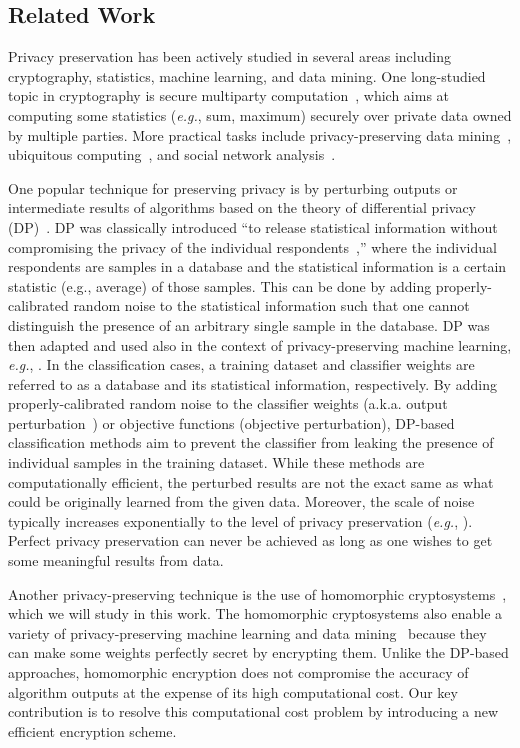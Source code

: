 \documentclass[10pt,twocolumn,letterpaper]{article}
\def\eg{{\it e.g.}}
\begin{document}
\subsection*{Related Work}
Privacy preservation has been actively studied in several areas including cryptography, statistics, machine learning, and data mining. One long-studied topic in cryptography is secure multiparty computation~\cite{Yao1986a}, which aims at computing some statistics (\eg, sum, maximum) securely over private data owned by multiple parties. More practical tasks include privacy-preserving data mining~\cite{Aggarwal2008a,Agrawal2000}, ubiquitous computing~\cite{Krumm2009a}, and social network analysis~\cite{Zhou2008a}.

One popular technique for preserving privacy is by perturbing outputs or intermediate results of algorithms based on the theory of differential privacy (DP)~\cite{Dwork2006a,Dwork2008a}. DP was classically introduced ``to release statistical information without compromising the privacy of the individual respondents~\cite{Dwork2008a},'' where the individual respondents are samples in a database and the statistical information is a certain statistic (e.g., average) of those samples. This can be done by adding properly-calibrated random noise to the statistical information such that one cannot distinguish the presence of an arbitrary single sample in the database. DP was then adapted and used also in the context of privacy-preserving machine learning, \eg, \cite{Chaudhuri2008a,Chaudhuri2011a,Chu2016a,Pathak2010a,Rajkumar2012a,Shokri2015a}. In the classification cases, a training dataset and classifier weights are referred to as a database and its statistical information, respectively. By adding properly-calibrated random noise to the classifier weights (a.k.a. output perturbation~\cite{Chaudhuri2011a}) or objective functions (objective perturbation), DP-based classification methods aim to prevent the classifier from leaking the presence of individual samples in the training dataset. While these methods are computationally efficient, the perturbed results are not the exact same as what could be originally learned from the given data. Moreover, the scale of noise typically increases exponentially to the level of privacy preservation (\eg, \cite{Dwork2006}). Perfect privacy preservation can never be achieved as long as one wishes to get some meaningful results from data. 

Another privacy-preserving technique is the use of homomorphic cryptosystems~\cite{OdedGoldreich2004}, which we will study in this work. The homomorphic cryptosystems also enable a variety of privacy-preserving machine learning and data mining~\cite{Bost2015a,Dowlin2016a,Graepel2012,Lindell2009a,Pathak2010a,Pinkas2002a,Takabi2016a,Vaidya2003a,Yuan2014a} because they can make some weights perfectly secret by encrypting them. Unlike the DP-based approaches, homomorphic encryption does not compromise the accuracy of algorithm outputs at the expense of its high computational cost. Our key contribution is to resolve this computational cost problem by introducing a new efficient encryption scheme.
\end{document}
